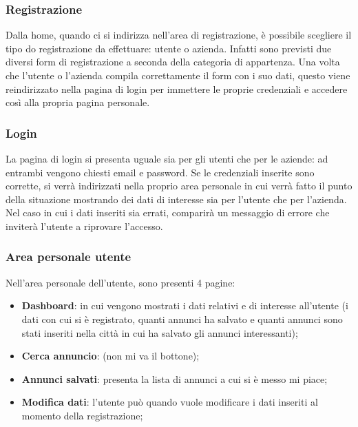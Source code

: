 		\subsubsection{Registrazione}
		Dalla home, quando ci si indirizza nell'area di registrazione, è possibile scegliere il tipo do registrazione da effettuare: utente o azienda. Infatti sono previsti due diversi form di registrazione a seconda della categoria di appartenza. Una volta che l'utente o l'azienda compila correttamente il form con i suo dati, questo viene reindirizzato nella pagina di login per immettere le proprie credenziali e accedere così alla propria pagina personale.
		\subsubsection{Login}
		La pagina di login si presenta uguale sia per gli utenti che per le aziende: ad entrambi vengono chiesti email e password. Se le credenziali inserite sono corrette, si verrà indirizzati nella proprio area personale in cui verrà fatto il punto della situazione mostrando dei dati di interesse sia per l'utente che per l'azienda. Nel caso in cui i dati inseriti sia errati, comparirà un messaggio di errore che inviterà l'utente a riprovare l'accesso.
		\subsubsection{Area personale utente}
		Nell'area personale dell'utente, sono presenti 4 pagine:
		\begin{itemize}
			\item \textbf{Dashboard}: in cui vengono mostrati i dati relativi e di interesse all'utente (i dati con cui si è registrato, quanti annunci ha salvato e quanti annunci sono stati inseriti nella città in cui ha salvato gli annunci interessanti);
			\item \textbf{Cerca annuncio}: (non mi va il bottone);
			\item \textbf{Annunci salvati}: presenta la lista di annunci a cui si è messo mi piace;
			\item \textbf{Modifica dati}: l'utente può quando vuole modificare i dati inseriti al momento della registrazione; 
		\end{itemize}

